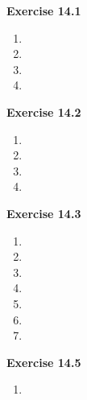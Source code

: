 




\textbf{Exercise 14.1}
\begin{enumerate}
    \item 
    \item 
    \item 
    \item 
\end{enumerate}

\textbf{Exercise 14.2}
\begin{enumerate}
    \item 
    \item 
    \item 
    \item 
\end{enumerate}

\textbf{Exercise 14.3}
\begin{enumerate}
    \item 
    \item 
    \item 
    \item 
    \item 
    \item 
    \item 
\end{enumerate}

\textbf{Exercise 14.5}
\begin{enumerate}
    \item 
\end{enumerate}


